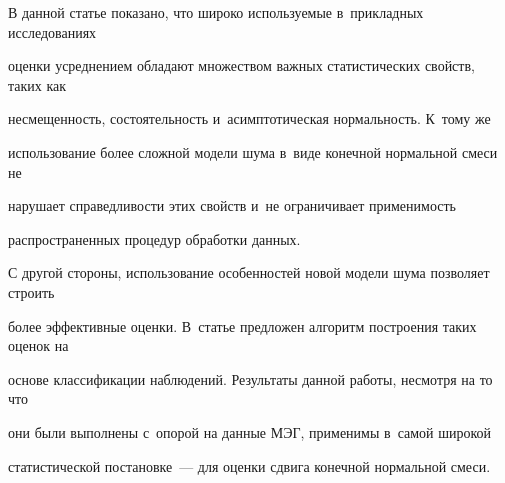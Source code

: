 В данной статье показано, что широко используемые в~прикладных исследованиях 


оценки усреднением обладают множеством важных статистических свойств, таких как 


несмещенность, состоятельность и~асимптотическая нормальность. К~тому же 


использование более сложной модели шума в~виде конечной нормальной смеси не 


нарушает справедливости этих свойств и~не ограничивает применимость 


распространенных процедур обработки данных.








С другой стороны, использование особенностей новой модели шума позволяет строить 


более эффективные оценки. В~статье предложен алгоритм построения таких оценок на 


основе классификации наблюдений. Результаты данной работы, несмотря на то что 


они были выполнены с~опорой на данные МЭГ, применимы в~самой широкой 


статистической постановке~--- для оценки сдвига конечной нормальной смеси.








